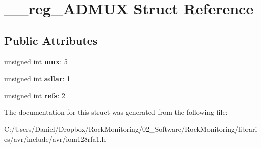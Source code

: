 \hypertarget{struct____reg___a_d_m_u_x}{}\section{\+\_\+\+\_\+reg\+\_\+\+A\+D\+M\+UX Struct Reference}
\label{struct____reg___a_d_m_u_x}
\subsection*{Public Attributes}
\begin{DoxyCompactItemize}
\item 
unsigned int {\bfseries mux}\+: 5\hypertarget{struct____reg___a_d_m_u_x_a14fff55ad14102871f6762b5224f6cbd}{}\label{struct____reg___a_d_m_u_x_a14fff55ad14102871f6762b5224f6cbd}

\item 
unsigned int {\bfseries adlar}\+: 1\hypertarget{struct____reg___a_d_m_u_x_ace35f47fd11ea146858e115dcc29fea1}{}\label{struct____reg___a_d_m_u_x_ace35f47fd11ea146858e115dcc29fea1}

\item 
unsigned int {\bfseries refs}\+: 2\hypertarget{struct____reg___a_d_m_u_x_a5f9c09a79cfa120aa7e1e2aeff4e1291}{}\label{struct____reg___a_d_m_u_x_a5f9c09a79cfa120aa7e1e2aeff4e1291}

\end{DoxyCompactItemize}


The documentation for this struct was generated from the following file\+:\begin{DoxyCompactItemize}
\item 
C\+:/\+Users/\+Daniel/\+Dropbox/\+Rock\+Monitoring/02\+\_\+\+Software/\+Rock\+Monitoring/libraries/avr/include/avr/iom128rfa1.\+h\end{DoxyCompactItemize}
